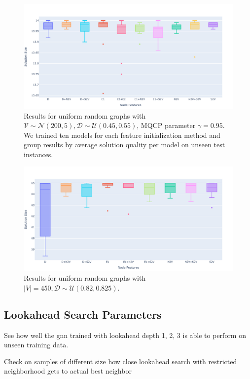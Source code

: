 \documentclass[draft,final]{vutinfth} %
\begin{document}
\begin{figure}
    \centering
    \includegraphics[width=\textwidth]{graphics/V200-045-055.pdf}
    \caption[]{Results for uniform random graphs with $ \mathcal{V} \sim \mathcal{N}(200, 5), \mathcal{D} \sim \mathcal{U}(0.45, 0.55)$, MQCP parameter $\gamma=0.95$. We trained ten models for each feature initialization method and group results by average solution quality per model on unseen test instances. }
    \label{fig:V200-node-features}
\end{figure}

\begin{figure}
    \centering
    \includegraphics[width=\textwidth]{graphics/V450-082-0825.pdf}
    \caption[]{Results for uniform random graphs with $ |V| = 450, \mathcal{D} \sim \mathcal{U}(0.82, 0.825)$. }
    \label{fig:V450-node-features}
\end{figure}

\subsection{Lookahead Search Parameters}
See how well the gnn trained with lookahead depth 1, 2, 3 is able to perform on unseen training data. 

Check on samples of different size how close lookahead search with restricted neighborhood gets to actual best neighbor 
\end{document}
